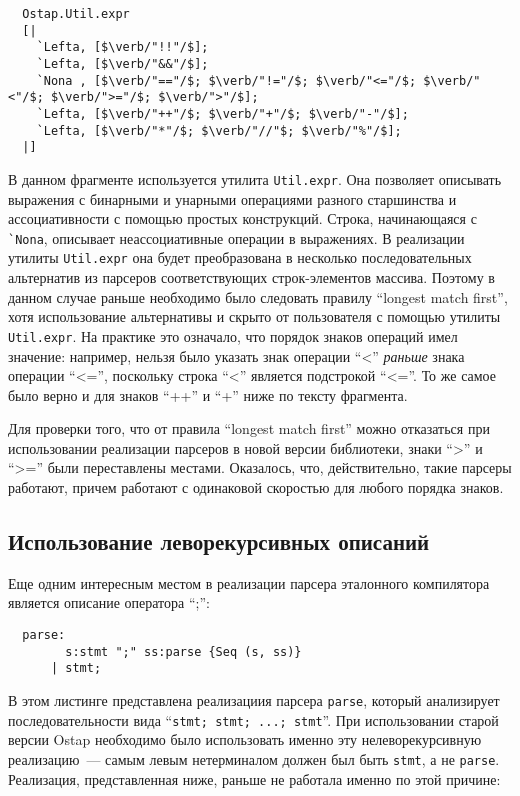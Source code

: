 \documentclass[conference]{IEEEtran}
\begin{document}
\begin{lstlisting}
  Ostap.Util.expr
  [|
    `Lefta, [$\verb/"!!"/$];
    `Lefta, [$\verb/"&&"/$];
    `Nona , [$\verb/"=="/$; $\verb/"!="/$; $\verb/"<="/$; $\verb/"<"/$; $\verb/">="/$; $\verb/">"/$];
    `Lefta, [$\verb/"++"/$; $\verb/"+"/$; $\verb/"-"/$];
    `Lefta, [$\verb/"*"/$; $\verb/"//"$; $\verb/"%"/$];
  |]
\end{lstlisting}

В данном фрагменте используется утилита \lstinline|Util.expr|. Она позволяет описывать выражения
с бинарными и унарными операциями разного старшинства и ассоциативности с помощью простых конструкций. Строка, начинающаяся с \lstinline|`Nona|, описывает неассоциативные
операции в выражениях. В реализации утилиты \lstinline|Util.expr| она будет преобразована в несколько последовательных альтернатив из парсеров соответствующих
строк-элементов массива. Поэтому в данном случае раньше необходимо было следовать правилу ``longest match first'', хотя использование альтернативы и скрыто от пользователя
с помощью утилиты \lstinline|Util.expr|. На практике это означало, что порядок знаков операций имел значение: например, нельзя было указать знак операции ``<'' \emph{раньше}
знака операции ``<='', поскольку строка ``<'' является подстрокой ``<=''. То же самое было верно и для знаков ``++'' и ``+'' ниже по тексту фрагмента.

Для проверки того, что от правила ``longest match first'' можно отказаться при использовании реализации парсеров в новой версии библиотеки, знаки ``>'' и ``>='' были
переставлены местами. Оказалось, что, действительно, такие парсеры работают, причем работают с одинаковой скоростью для любого порядка знаков.

\subsection{Использование леворекурсивных описаний}

Еще одним интересным местом в реализации парсера эталонного компилятора является описание оператора ``;'':

\begin{lstlisting}
  parse:
        s:stmt ";" ss:parse {Seq (s, ss)}
      | stmt;
\end{lstlisting}

В этом листинге представлена реализациия парсера \lstinline|parse|, который анализирует последовательности вида ``\lstinline|stmt; stmt; ...; stmt|''. При использовании старой
версии Ostap необходимо было использовать именно эту нелеворекурсивную реализацию~--- самым левым нетерминалом должен был быть \lstinline|stmt|, а не \lstinline|parse|. Реализация,
представленная ниже, раньше не работала именно по этой причине:
\end{document}
